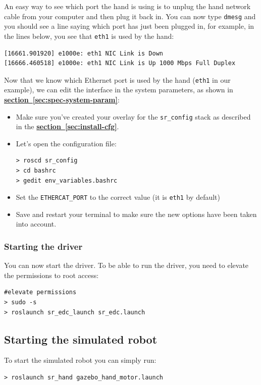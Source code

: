 \documentclass[12pt]{article}
\newcommand{\link}[1]{\hyperref[sec:#1]{\textbf{section~\ref*{sec:#1}}}}
\begin{document}
\par An easy way to see which port the hand is using is to unplug the hand network cable from your computer and then plug it back in. You can now type \texttt{dmesg} and you should see a line saying which port has just been plugged in, for example, in the lines below, you see that \texttt{eth1} is used by the hand:
  \begin{lstlisting}[escapeinside='']
[16661.901920] e1000e: eth1 NIC Link is Down
[16666.460518] e1000e: eth1 NIC Link is Up 1000 Mbps Full Duplex
  \end{lstlisting}

\par Now that we know which Ethernet port is used by the hand (\texttt{eth1} in our example), we can edit the interface in the system parameters, as shown in \link{spec-system-param}:
\begin{itemize}
\item Make sure you've created your overlay for the \texttt{sr\_config} stack as described in the \link{install-cfg}.
\item Let's open the configuration file:
  \begin{lstlisting}[escapeinside='']
> roscd sr_config
> cd bashrc
> gedit env_variables.bashrc
  \end{lstlisting}
\item Set the \texttt{ETHERCAT\_PORT} to the correct value (it is \texttt{eth1} by default)
\item Save and restart your terminal to make sure the new options have been taken into account.
\end{itemize}

\subsubsection{Starting the driver}
\par You can now start the driver. To be able to run the driver, you need to elevate the permissions to root access:
  \begin{lstlisting}[escapeinside='']
#elevate permissions
> sudo -s
> roslaunch sr_edc_launch sr_edc.launch
  \end{lstlisting}

\subsection{Starting the simulated robot}
\label{sec:start-simul-hand}
\par To start the simulated robot you can simply run:
  \begin{lstlisting}[escapeinside='']
> roslaunch sr_hand gazebo_hand_motor.launch
  \end{lstlisting}
\end{document}
